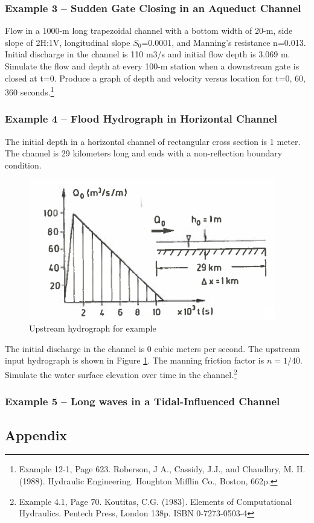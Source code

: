 \subsubsection{Example 3 -- Sudden Gate Closing in an Aqueduct Channel}
Flow in a 1000-m long trapezoidal channel with a bottom width of 20-m, side slope of 2H:1V, longitudinal slope $S_0$=0.0001, and Manning's resistance n=0.013. 
Initial discharge in the channel is 110 m3/s and initial flow depth is 3.069 m.
Simulate the flow and depth at every 100-m station when a downstream gate is closed at t=0. 
Produce a graph of depth and velocity versus location for t=0, 60, 360 seconds.\footnote{Example 12-1, Page 623. Roberson, J A., Cassidy, J.J., and Chaudhry, M. H. (1988). Hydraulic Engineering. Houghton Mifflin Co., Boston, 662p. }

\subsubsection{Example 4 -- Flood Hydrograph in Horizontal Channel}
The initial depth in a horizontal channel of rectangular cross section is 1 meter. 
The channel is 29 kilometers long and ends with a non-reflection boundary condition.
\newpage
\begin{figure}[h!] %
   \centering
   \includegraphics[width=4.25in]{upstreamHydro.jpg} 
   \caption{Upstream hydrograph for example}
   \label{fig:upstreamHydro}
\end{figure}

The initial discharge in the channel is 0 cubic meters per second. 
The upstream input hydrograph is shown in Figure \ref{fig:upstreamHydro}.
The manning friction factor is $n=1/40$.
Simulate the water surface elevation over time in the channel.\footnote{Example 4.1, Page 70. Koutitas, C.G. (1983). Elements of Computational Hydraulics. Pentech Press, London 138p. ISBN 0-7273-0503-4 }


\subsubsection{Example 5 -- Long waves in a Tidal-Influenced Channel}


\subsection{Appendix}
